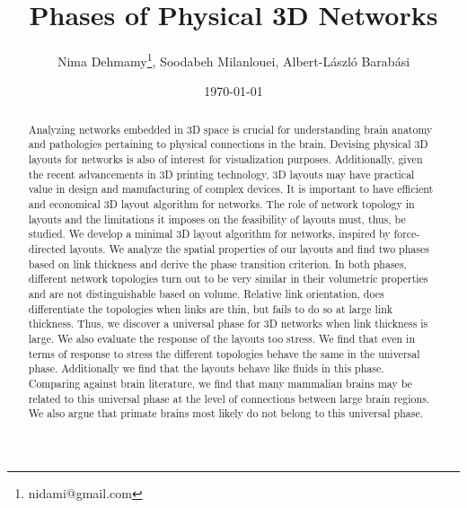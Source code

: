 \documentclass[nofootinbib,preprint,floatfix,endfloats]{revtex4} %
\begin{document}
\title{Phases of Physical 3D Networks}
\author{Nima Dehmamy\thanks{nidami@gmail.com}, Soodabeh Milanlouei, Albert-L\'aszl\'o Barab\'asi}
\date{\today}

\begin{abstract}
Analyzing networks embedded in 3D space is crucial for understanding brain anatomy and pathologies pertaining to physical connections in the brain. 
Devising physical 3D layouts for networks is also of interest for  visualization purposes.
Additionally, given the recent advancements in 3D printing technology, 3D layouts may have practical value in design and manufacturing of complex devices. 
It is important to have efficient and economical 3D layout algorithm for networks. 
The role of network topology in layouts and the limitations it imposes on the feasibility of layouts must, thus, be studied.
We develop a minimal 3D layout algorithm for networks, inspired by force-directed layouts. 
We analyze the spatial properties of our layouts and find two phases based on link thickness and derive the phase transition criterion.  
In both phases, different network topologies turn out to be very similar in their volumetric properties and are not distinguishable based on volume. 
Relative link orientation, does differentiate the topologies when links are thin, but fails to do so at large link thickness. 
Thus, we discover a universal phase for 3D networks when link thickness is large.
We also evaluate the response of the layouts too stress. 
We find that even in terms of response to stress the different topologies behave the same in the universal phase. 
Additionally we find that the layouts behave like fluids in this phase. 
Comparing against brain literature, we find that many mammalian brains may be related to this universal phase at the level of connections between large brain regions.  
We also argue that primate brains most likely do not belong to this universal phase. 
\end{abstract}

\maketitle


\end{document}
